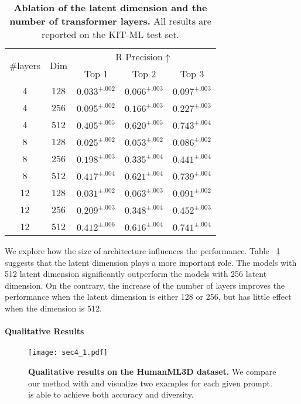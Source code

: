 \begin{table}[ht]
\centering
\caption{\textbf{Ablation of the latent dimension and the number of transformer layers.} All results are reported on the KIT-ML test set.}
\label{tab:kit_feat_layer}
\setlength{\tabcolsep}{1.4mm}
{
\begin{tabular}{ccccc}
\hline

\multirow{2}{1cm}{\centering \#layers} & \multirow{2}{1cm}{\centering Dim} & \multicolumn{3}{c}{\centering R Precision$\uparrow$}  \\
& & Top 1 & Top 2 & Top 3 \\
\hline
4 & 128 & $0.033^{\pm.002}$ & $0.066^{\pm.003}$ & $0.097^{\pm.003}$ \\
4 & 256 & $0.095^{\pm.002}$ & $0.166^{\pm.003}$ & $0.227^{\pm.003}$ \\
4 & 512 & $0.405^{\pm.005}$ & $0.620^{\pm.005}$ & $\mathbf{0.743^{\pm.004}}$ \\
8 & 128 & $0.025^{\pm.002}$ & $0.053^{\pm.002}$ & $0.086^{\pm.002}$ \\
8 & 256 & $0.198^{\pm.003}$ & $0.335^{\pm.004}$ & $0.441^{\pm.004}$ \\
8 & 512 & $\mathbf{0.417^{\pm.004}}$ & $\mathbf{0.621^{\pm.004}}$ & $0.739^{\pm.004}$ \\
12 & 128 & $0.031^{\pm.002}$ & $0.063^{\pm.003}$ & $0.091^{\pm.002}$ \\
12 & 256 & $0.209^{\pm.003}$ & $0.348^{\pm.004}$ & $0.452^{\pm.003}$ \\
12 & 512 & $0.412^{\pm.006}$ & $0.616^{\pm.004}$ & $0.741^{\pm.004}$ \\
\hline
\end{tabular}}
\end{table}

We explore how the size of architecture influences the performance. Table ~\ref{tab:kit_feat_layer} suggests that the latent dimension plays a more important role. The models with 512 latent dimension significantly outperform the models with 256 latent dimension. On the contrary, the increase of the number of layers improves the performance when the latent dimension is either 128 or 256, but has little effect when the dimension is 512.

\paragraph{Qualitative Results}\label{sec4_1_4}

\begin{figure*}[t]
    \centering
    \texttt{[image: sec4\_1.pdf]}
    \caption{\textbf{Qualitative results on the HumanML3D dataset.} We compare our method with \cite{guo2022generating} and visualize two examples for each given prompt. \name is able to achieve both accuracy and diversity.}
    \label{fig:sec4_1}
\end{figure*}


